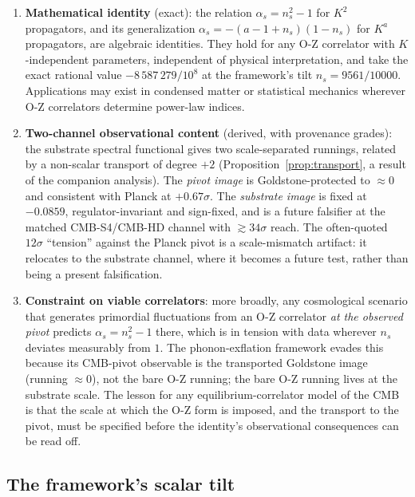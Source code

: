 \documentclass[12pt]{article}
\theoremstyle{definition}
\theoremstyle{remark}
\begin{document}
\begin{enumerate}
  \item \textbf{Mathematical identity} (exact): the relation $\alpha_s = n_s^2 - 1$ for $K^2$ propagators, and its generalization $\alpha_s = -(a-1+n_s)(1-n_s)$ for $K^a$ propagators, are algebraic identities. They hold for any O-Z correlator with $K$-independent parameters, independent of physical interpretation, and take the exact rational value $-8\,587\,279/10^8$ at the framework's tilt $n_s = 9561/10000$. Applications may exist in condensed matter or statistical mechanics wherever O-Z correlators determine power-law indices.

  \item \textbf{Two-channel observational content} (derived, with provenance grades): the substrate spectral functional gives two scale-separated runnings, related by a non-scalar transport of degree $+2$ (Proposition~\ref{prop:transport}, a result of the companion analysis). The \emph{pivot image} is Goldstone-protected to $\approx 0$ and consistent with Planck at $+0.67\sigma$. The \emph{substrate image} is fixed at $-0.0859$, regulator-invariant and sign-fixed, and is a future falsifier at the matched CMB-S4/CMB-HD channel with $\gtrsim 34\sigma$ reach. The often-quoted $12\sigma$ ``tension'' against the Planck pivot is a scale-mismatch artifact: it relocates to the substrate channel, where it becomes a future test, rather than being a present falsification.

  \item \textbf{Constraint on viable correlators}: more broadly, any cosmological scenario that generates primordial fluctuations from an O-Z correlator \emph{at the observed pivot} predicts $\alpha_s = n_s^2 - 1$ there, which is in tension with data wherever $n_s$ deviates measurably from $1$. The phonon-exflation framework evades this because its CMB-pivot observable is the transported Goldstone image (running $\approx 0$), not the bare O-Z running; the bare O-Z running lives at the substrate scale. The lesson for any equilibrium-correlator model of the CMB is that the scale at which the O-Z form is imposed, and the transport to the pivot, must be specified before the identity's observational consequences can be read off.
\end{enumerate}

\subsection{The framework's scalar tilt}
\end{document}
